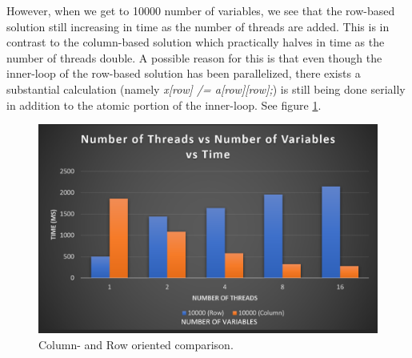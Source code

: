     However, when we get to 10000 number of variables, we see that the row-based solution still increasing in time as the number of threads are added.
    This is in contrast to the column-based solution which practically halves in time as the number of threads double.
    A possible reason for this is that even though the inner-loop of the row-based solution has been parallelized, there exists a substantial calculation (namely \textit{x[row] /= a[row][row];})
    is still being done serially in addition to the atomic portion of the inner-loop. See figure \ref{fig:rowcol}.
    \begin{figure}
      \centering
      \includegraphics[width=\linewidth]{Figures/rowcol.png}
      \caption{Column- and Row oriented comparison.}
      \label{fig:rowcol}
    \end{figure}

